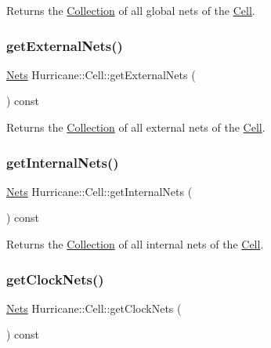 Returns the \mbox{\hyperlink{classHurricane_1_1Collection}{Collection}} of all global nets of the \mbox{\hyperlink{classHurricane_1_1Cell}{Cell}}. \mbox{\label{classHurricane_1_1Cell_aa80f3345db8c1395fa04a50737208793}} 
\subsubsection{\texorpdfstring{get\+External\+Nets()}{getExternalNets()}}
{\footnotesize\ttfamily \mbox{\hyperlink{namespaceHurricane_a3404a8b17130a1824f4a281704b04df7}{Nets}} Hurricane\+::\+Cell\+::get\+External\+Nets (\begin{DoxyParamCaption}{ }\end{DoxyParamCaption}) const}

Returns the \mbox{\hyperlink{classHurricane_1_1Collection}{Collection}} of all external nets of the \mbox{\hyperlink{classHurricane_1_1Cell}{Cell}}. \mbox{\label{classHurricane_1_1Cell_a0da980d28ad60334da94a3966338f873}} 
\subsubsection{\texorpdfstring{get\+Internal\+Nets()}{getInternalNets()}}
{\footnotesize\ttfamily \mbox{\hyperlink{namespaceHurricane_a3404a8b17130a1824f4a281704b04df7}{Nets}} Hurricane\+::\+Cell\+::get\+Internal\+Nets (\begin{DoxyParamCaption}{ }\end{DoxyParamCaption}) const}

Returns the \mbox{\hyperlink{classHurricane_1_1Collection}{Collection}} of all internal nets of the \mbox{\hyperlink{classHurricane_1_1Cell}{Cell}}. \mbox{\label{classHurricane_1_1Cell_a306f28990f9fd4ccee0e9e8ebecf98fc}} 
\subsubsection{\texorpdfstring{get\+Clock\+Nets()}{getClockNets()}}
{\footnotesize\ttfamily \mbox{\hyperlink{namespaceHurricane_a3404a8b17130a1824f4a281704b04df7}{Nets}} Hurricane\+::\+Cell\+::get\+Clock\+Nets (\begin{DoxyParamCaption}{ }\end{DoxyParamCaption}) const}

